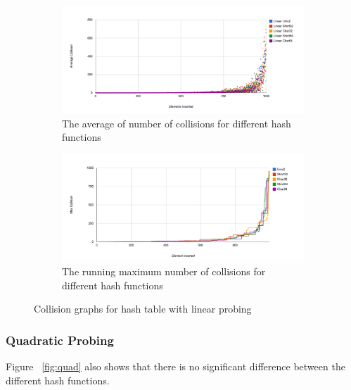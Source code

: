 \documentclass[11pt]{article}
\begin{document}
\begin{figure}
        \begin{subfigure}[b]{1\textwidth}
                \centering
                \includegraphics[width=\textwidth]{linear-collision.png}
                \caption{The average of number of collisions for different hash functions}
                \label{fig:linear-collision}
        \end{subfigure}
        

         \begin{subfigure}[b]{1\textwidth}
                \centering
                \includegraphics[width=\textwidth]{linear-max-query.png}
                \caption{The running maximum number of collisions for different hash functions}
                \label{fig:linear-max}
        \end{subfigure}
        \caption{Collision graphs for hash table with linear probing}\label{fig:linear}
\end{figure}


\subsubsection{Quadratic Probing}
Figure ~\ref{fig:quad} also shows that there is no significant difference
between the different hash functions.
\end{document}
